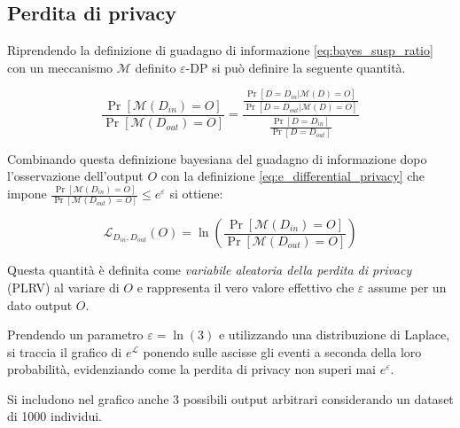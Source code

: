 \subsection{Perdita di privacy}

Riprendendo la definizione di guadagno di informazione \ref{eq:bayes_susp_ratio} con un meccanismo $\mathcal{M}$ definito $\varepsilon$-DP si può definire la seguente quantità.

\begin{equation}
     \frac{\Pr[\mathcal{M}(D_{in}) = O]}{\Pr[\mathcal{M}(D_{out}) = O]} = \frac{\frac{\Pr[D = D_{in} | \mathcal{M}(D) = O]}{\Pr[D = D_{out} | \mathcal{M}(D) = O]}}{\frac{\Pr[D = D_{in}]}{\Pr[D = D_{out}]}}
\end{equation}

Combinando questa definizione bayesiana del guadagno di informazione dopo l'osservazione dell'output $O$ con la definizione \ref{eq:e_differential_privacy} che impone $\frac{\Pr[\mathcal{M}(D_{in}) = O]}{\Pr[\mathcal{M}(D_{out}) = O]} \le e^\varepsilon$ si ottiene:

\begin{equation}
    \mathcal{L}_{D_{in},D_{out}}(O) = \ln \left(\frac{\Pr[\mathcal{M}(D_{in}) = O]}{\Pr[\mathcal{M}(D_{out}) = O]}\right)
\end{equation}

Questa quantità è definita come \textit{variabile aleatoria della perdita di privacy} (PLRV) al variare di $O$ e rappresenta il vero valore effettivo che $\varepsilon$ assume per un dato output $O$.

Prendendo un parametro $\varepsilon = \ln (3)$ e utilizzando una distribuzione di Laplace, si traccia il grafico di $e^{\mathcal{L}}$ ponendo sulle ascisse gli eventi a seconda della loro probabilità, evidenziando come la perdita di privacy non superi mai $e^\varepsilon$.

Si includono nel grafico anche 3 possibili output arbitrari considerando un dataset di 1000 individui.

